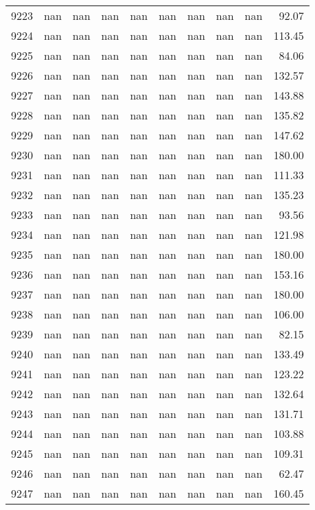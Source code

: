 \begin{tabular}{lrrrrrrrrr}
9223 & nan & nan & nan & nan & nan & nan & nan & nan & 92.07 \\
9224 & nan & nan & nan & nan & nan & nan & nan & nan & 113.45 \\
9225 & nan & nan & nan & nan & nan & nan & nan & nan & 84.06 \\
9226 & nan & nan & nan & nan & nan & nan & nan & nan & 132.57 \\
9227 & nan & nan & nan & nan & nan & nan & nan & nan & 143.88 \\
9228 & nan & nan & nan & nan & nan & nan & nan & nan & 135.82 \\
9229 & nan & nan & nan & nan & nan & nan & nan & nan & 147.62 \\
9230 & nan & nan & nan & nan & nan & nan & nan & nan & 180.00 \\
9231 & nan & nan & nan & nan & nan & nan & nan & nan & 111.33 \\
9232 & nan & nan & nan & nan & nan & nan & nan & nan & 135.23 \\
9233 & nan & nan & nan & nan & nan & nan & nan & nan & 93.56 \\
9234 & nan & nan & nan & nan & nan & nan & nan & nan & 121.98 \\
9235 & nan & nan & nan & nan & nan & nan & nan & nan & 180.00 \\
9236 & nan & nan & nan & nan & nan & nan & nan & nan & 153.16 \\
9237 & nan & nan & nan & nan & nan & nan & nan & nan & 180.00 \\
9238 & nan & nan & nan & nan & nan & nan & nan & nan & 106.00 \\
9239 & nan & nan & nan & nan & nan & nan & nan & nan & 82.15 \\
9240 & nan & nan & nan & nan & nan & nan & nan & nan & 133.49 \\
9241 & nan & nan & nan & nan & nan & nan & nan & nan & 123.22 \\
9242 & nan & nan & nan & nan & nan & nan & nan & nan & 132.64 \\
9243 & nan & nan & nan & nan & nan & nan & nan & nan & 131.71 \\
9244 & nan & nan & nan & nan & nan & nan & nan & nan & 103.88 \\
9245 & nan & nan & nan & nan & nan & nan & nan & nan & 109.31 \\
9246 & nan & nan & nan & nan & nan & nan & nan & nan & 62.47 \\
9247 & nan & nan & nan & nan & nan & nan & nan & nan & 160.45 \\

\end{tabular}
